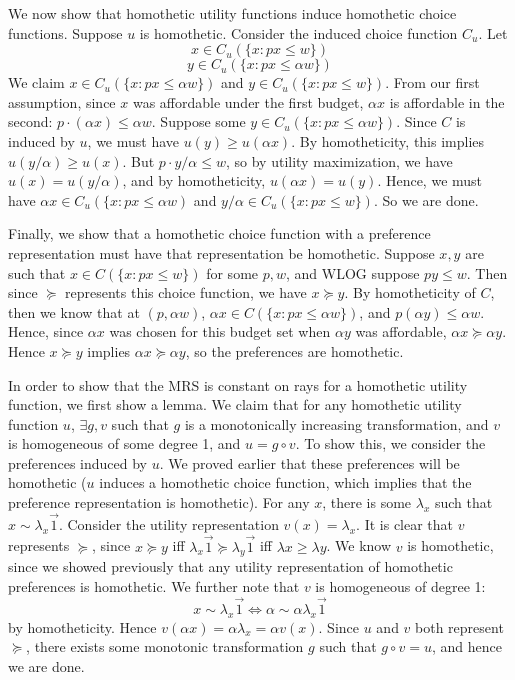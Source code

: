 \documentclass[10pt,letter]{article}
\begin{document}
We now show that homothetic utility functions induce homothetic choice functions. Suppose $u$ is homothetic. Consider the induced choice function $C_u$. Let
\[ x \in C_u(\{ x : px \le w \}) \]
\[ y \in C_u(\{ x: px \le \alpha w \}) \]
We claim $x \in C_u(\{ x: px \le \alpha w \})$ and $y \in C_u(\{ x : px \le w \})$. From our first assumption, since $x$ was affordable under the first budget, $\alpha x$ is affordable in the second: $p \cdot (\alpha x) \le \alpha w$. Suppose some $y \in C_u(\{ x: px \le \alpha w \})$. Since $C$ is induced by $u$, we must have $u(y) \ge u(\alpha x)$. By homotheticity, this implies $u(y/\alpha) \ge u( x)$. But $p \cdot y/\alpha \le w$, so by utility maximization, we have $u(x) = u(y/\alpha)$, and by homotheticity, $u(\alpha x) = u(y)$. Hence, we must have $\alpha x \in C_u(\{ x : px \le \alpha w)$ and $y/\alpha \in C_u(\{ x: px \le w \})$. So we are done.

Finally, we show that a homothetic choice function with a preference representation must have that representation be homothetic. Suppose $x, y$ are such that $x \in C(\{ x: px \le w \})$ for some $p, w$, and WLOG suppose $py \le w$. Then since $\succeq$ represents this choice function, we have $x \succeq y$. By homotheticity of $C$, then we know that at $(p, \alpha w)$, $\alpha x \in C(\{ x : px \le \alpha w \})$, and $p(\alpha y) \le \alpha w$. Hence, since $\alpha x$ was chosen for this budget set when $\alpha y$ was affordable, $\alpha x \succeq \alpha y$. Hence $x\succeq y$ implies $\alpha x \succeq \alpha y$, so the preferences are homothetic.

In order to show that the MRS is constant on rays for a homothetic utility function, we first show a lemma. We claim that for any homothetic utility function $u$, $\exists g, v$ such that $g$ is a monotonically increasing transformation, and $v$ is homogeneous of some degree 1, and $u = g \circ v$. To show this, we consider the preferences induced by $u$. We proved earlier that these preferences will be homothetic ($u$ induces a homothetic choice function, which implies that the preference representation is homothetic). For any $x$, there is some $\lambda_x$ such that $x \sim \lambda_x \vec{1}$. Consider the utility representation $v(x) = \lambda_x$. It is clear that $v$ represents $\succeq$, since
$x \succeq y$ iff $\lambda_x \vec{1} \succeq \lambda_y \vec{1} $ iff $\lambda x \ge \lambda y$. We know $v$ is homothetic, since we showed previously that any utility representation of homothetic preferences is homothetic. We further note that $v$ is homogeneous of degree 1:
\[ x \sim \lambda_x \vec{1} \iff \alpha \sim \alpha \lambda_x \vec{1} \]
by homotheticity. Hence $v(\alpha x) = \alpha \lambda_x = \alpha v(x)$. Since $u$ and $v$ both represent $\succeq$, there exists some monotonic transformation $g$ such that $g\circ v = u$, and hence we are done.
\end{document}
